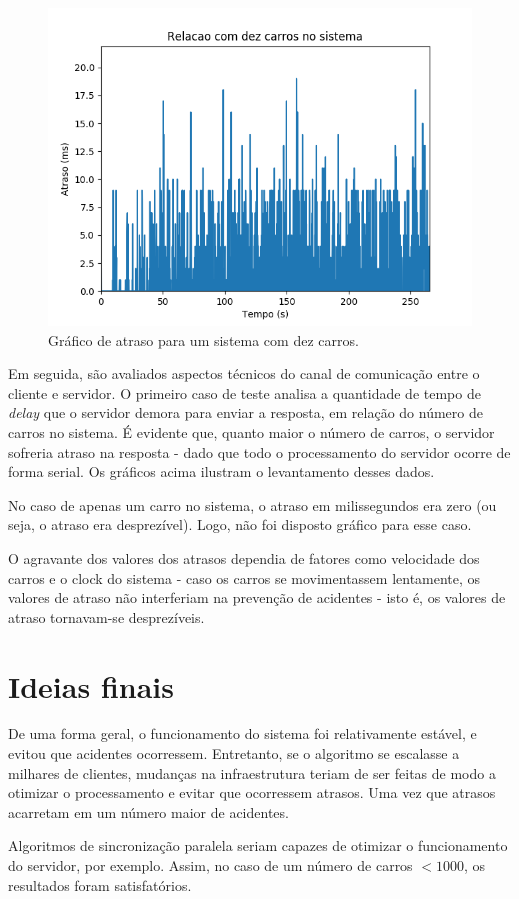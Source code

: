 \documentclass[10pt,twocolumn,letterpaper]{article}
\begin{document}
\begin{figure}[ht!]
    \center\includegraphics[width=.75\hsize]{img/dez}
    \caption{Gráfico de atraso para um sistema com dez carros.}
\end{figure}

Em seguida, são avaliados aspectos técnicos do canal de comunicação entre o cliente e servidor. O primeiro caso de teste analisa a quantidade de tempo de \textit{delay} que o servidor demora para enviar a resposta, em relação do número de carros no sistema. É evidente que, quanto maior o número de carros, o servidor sofreria atraso na resposta - dado que todo o processamento do servidor ocorre de forma serial. Os gráficos acima ilustram o levantamento desses dados.

No caso de apenas um carro no sistema, o atraso em milissegundos era zero (ou seja, o atraso era desprezível). Logo, não foi disposto gráfico para esse caso.

O agravante dos valores dos atrasos dependia de fatores como velocidade dos carros e o clock do sistema - caso os carros se movimentassem lentamente, os valores de atraso não interferiam na prevenção de acidentes - isto é, os valores de atraso tornavam-se desprezíveis. 

\section{Ideias finais}
De uma forma geral, o funcionamento do sistema foi relativamente estável, e evitou que acidentes ocorressem. Entretanto, se o algoritmo se escalasse a milhares de clientes, mudanças na infraestrutura teriam de ser feitas de modo a otimizar o processamento e evitar que ocorressem atrasos. Uma vez que atrasos acarretam em um número maior de acidentes.

Algoritmos de sincronização paralela seriam capazes de otimizar o funcionamento do servidor, por exemplo. Assim, no caso de um número de carros $< 1000$, os resultados foram satisfatórios.

{\small


}
\end{document}
